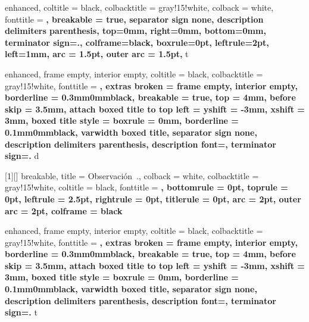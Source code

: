 \theoremstyle{definition}

\newtheorem{lemma}{Lema}[section]
\newtheorem{example}{Ejemplo}[section]
\newtheorem{theorem}{Teorema}[section]
\newtheorem{problem}{Problema}[section]
\newtheorem{property}{Propiedad}[section]
\newtheorem{exercise}{Ejercicio}[section]
\newtheorem{corollary}{Corolario}[section]
\newtheorem{definition}{Definición}[section]

\newtheorem*{note}{Nota}
\newtheorem*{hint}{Pista}

\newenvironment{solution}[1][]
{
    \begin{proof}[\textnormal{\textbf{Solución\ifthenelse{\equal{#1}{}}{}{ #1}}}]
    }{
    \end{proof}
}


{
    enhanced,
    coltitle = black,
    colbacktitle = gray!15!white,
    colback = white,
    fonttitle = \bfseries,
    breakable = true,
    separator sign none,
    description delimiters parenthesis,
    top=0mm,
    right=0mm,
    bottom=0mm,
    terminator sign={.},
    colframe=black,
    boxrule=0pt,
    leftrule=2pt,
    left=1mm,
    arc = 1.5pt,
    outer arc = 1.5pt,
}
{t}



{
    enhanced,
    frame empty,
    interior empty,
    coltitle = black,
    colbacktitle = gray!15!white,
    fonttitle = \bfseries,
    extras broken = {frame empty, interior empty},
    borderline = {0.3mm}{0mm}{black},
    breakable = true,
    top = 4mm,
    before skip = 3.5mm,
    attach boxed title to top left = {yshift = -3mm, xshift = 3mm},
    boxed title style = {boxrule = 0mm, borderline = {0.1mm}{0mm}{black}},
    varwidth boxed title,
    separator sign none, description delimiters parenthesis,
    description font=\bfseries,
    terminator sign={.\hspace{1mm}}
}
{d}


[1][]
{
    breakable,
    title = Observación~\thetcbcounter.,
    colback = white,
    colbacktitle = gray!15!white,
    coltitle = black,
    fonttitle = \bfseries,
    bottomrule = 0pt,
    toprule = 0pt,
    leftrule = 2.5pt,
    rightrule = 0pt,
    titlerule = 0pt,
    arc = 2pt,
    outer arc = 2pt,
    colframe = black
}

{
    enhanced,
    frame empty,
    interior empty,
    coltitle = black,
    colbacktitle = gray!15!white,
    fonttitle = \bfseries,
    extras broken = {frame empty, interior empty},
    borderline = {0.3mm}{0mm}{black},
    breakable = true,
    top = 4mm,
    before skip = 3.5mm,
    attach boxed title to top left = {yshift = -3mm, xshift = 3mm},
    boxed title style = {boxrule = 0mm, borderline = {0.1mm}{0mm}{black}},
    varwidth boxed title,
    separator sign none, description delimiters parenthesis,
    description font=\bfseries,
    terminator sign={.\hspace{1mm}}
}
{t}

